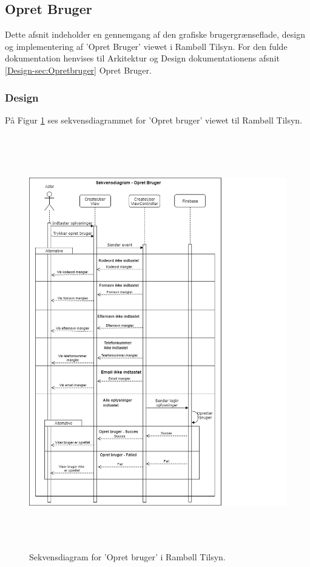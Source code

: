 \subsection{Opret Bruger}\label{sec:Opretbruger}
Dette afsnit indeholder en gennemgang af den grafiske brugergrænseflade, design og implementering af 'Opret Bruger' viewet i Rambøll Tilsyn. For den fulde dokumentation henvises til Arkitektur og Design dokumentationens afsnit \ref{Design-sec:Opretbruger} Opret Bruger.

\subsubsection{Design}
På Figur \ref{fig:OpretBrugerSekvens} ses sekvensdiagrammet for 'Opret bruger' viewet til Rambøll Tilsyn.
\begin{figure}[H] %
	\centering
	\includegraphics[height=18cm, width=15cm]{Design/Applikation/OpretBruger/OpretBrugerSekvensDiagram}
	\caption{Sekvensdiagram for 'Opret bruger' i Rambøll Tilsyn.}
	\label{fig:OpretBrugerSekvens}
\end{figure}

